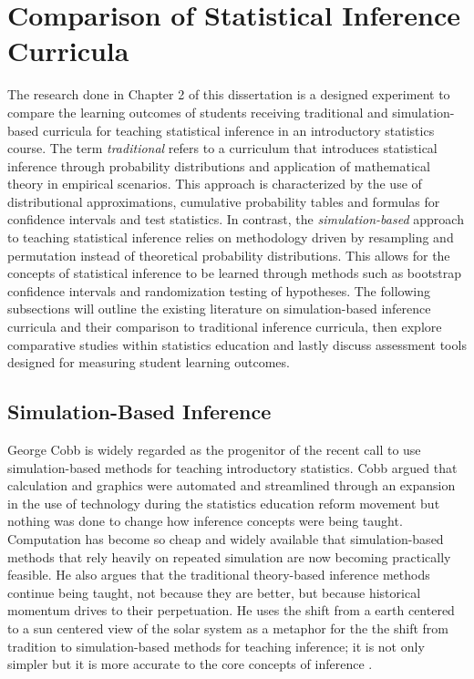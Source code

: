 \documentclass[11pt]{isuthesis}
\begin{document}

\section{Comparison of Statistical Inference Curricula} 

The research done in Chapter 2 of this dissertation is a designed experiment to compare the learning outcomes of students receiving traditional and simulation-based curricula for teaching statistical inference in an introductory statistics course.  The term \textit{traditional} refers to a curriculum that introduces statistical inference through probability distributions and application of mathematical theory in empirical scenarios. This approach is characterized by the use of distributional approximations, cumulative probability tables and formulas for confidence intervals and test statistics. In contrast, the \textit{simulation-based} approach to teaching statistical inference relies on methodology driven by resampling and permutation instead of theoretical probability distributions. This allows for the concepts of statistical inference to be learned through methods such as bootstrap confidence intervals and randomization testing of hypotheses. The following subsections will outline the existing literature on simulation-based inference curricula and their comparison to traditional inference curricula, then explore comparative studies within statistics education and lastly discuss assessment tools designed for measuring student learning outcomes.


\subsection{Simulation-Based Inference} 

George Cobb is widely regarded as the progenitor of the recent call to use simulation-based methods for teaching introductory statistics. Cobb argued that calculation and graphics were automated and streamlined through an expansion in the use of technology during the statistics education reform movement but nothing was done to change how inference concepts were being taught. Computation has become so cheap and widely available that simulation-based methods that rely heavily on repeated simulation are now becoming practically feasible. He also argues that the traditional theory-based inference methods continue being taught, not because they are better, but because historical momentum drives to their perpetuation. He uses the shift from a earth centered to a sun centered view of the solar system as a metaphor for the the shift from tradition to simulation-based methods for teaching inference; it is not only simpler but it is more accurate to the core concepts of inference \citep{Cobb2007}.
\end{document}
